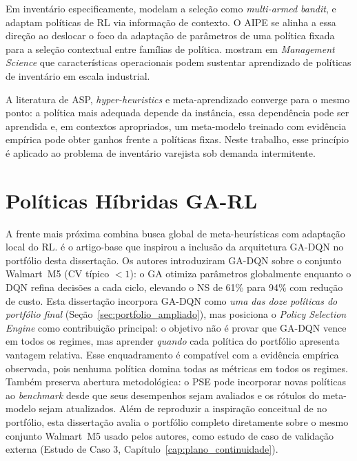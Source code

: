 Em inventário especificamente, \citet{Preil2022BanditInventory} modelam a seleção como \textit{multi-armed bandit}, e \citet{ContextualRL2024SupplyChain} adaptam políticas de RL via informação de contexto. O AIPE se alinha a essa direção ao deslocar o foco da adaptação de parâmetros de uma política fixada para a seleção contextual entre famílias de política. \citet{Qi2023EndToEndInventory} mostram em \textit{Management Science} que características operacionais podem sustentar aprendizado de políticas de inventário em escala industrial.

\smallskip
A literatura de ASP, \textit{hyper-heuristics} e meta-aprendizado converge para o mesmo ponto: a política mais adequada depende da instância, essa dependência pode ser aprendida e, em contextos apropriados, um meta-modelo treinado com evidência empírica pode obter ganhos frente a políticas fixas. Neste trabalho, esse princípio é aplicado ao problema de inventário varejista sob demanda intermitente.

\section{Políticas Híbridas GA-RL}

A frente mais próxima combina busca global de meta-heurísticas com adaptação local do RL. \citet{Zabraoui2025GaDQN} é o artigo-base que inspirou a inclusão da arquitetura GA-DQN no portfólio desta dissertação. Os autores introduziram GA-DQN sobre o conjunto Walmart~M5 (CV típico $<1$): o GA otimiza parâmetros globalmente enquanto o DQN refina decisões a cada ciclo, elevando o NS de 61\% para 94\% com redução de custo. Esta dissertação incorpora GA-DQN como \textit{uma das doze políticas do portfólio final} (Seção~\ref{sec:portfolio_ampliado}), mas posiciona o \textit{Policy Selection Engine} como contribuição principal: o objetivo não é provar que GA-DQN vence em todos os regimes, mas aprender \textit{quando} cada política do portfólio apresenta vantagem relativa. Esse enquadramento é compatível com a evidência empírica observada, pois nenhuma política domina todas as métricas em todos os regimes. Também preserva abertura metodológica: o PSE pode incorporar novas políticas ao \textit{benchmark} desde que seus desempenhos sejam avaliados e os rótulos do meta-modelo sejam atualizados. Além de reproduzir a inspiração conceitual de \citet{Zabraoui2025GaDQN} no portfólio, esta dissertação avalia o portfólio completo diretamente sobre o mesmo conjunto Walmart~M5 usado pelos autores, como estudo de caso de validação externa (Estudo de Caso 3, Capítulo~\ref{cap:plano_continuidade}).

